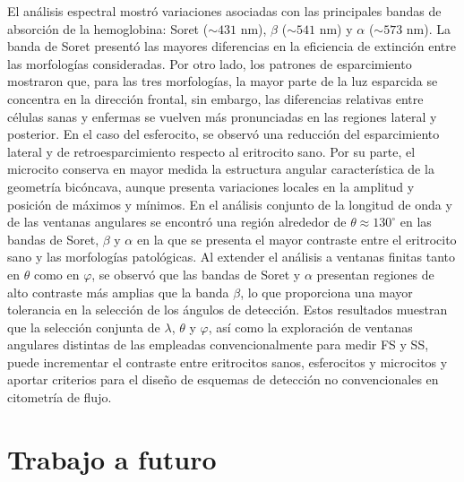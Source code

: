 El análisis espectral mostró variaciones asociadas con las principales bandas de absorción de la hemoglobina: Soret ($\sim 431$ nm), $\beta$ ($\sim 541$ nm) y $\alpha$ ($\sim 573$ nm). La banda de Soret presentó las mayores diferencias en la eficiencia de extinción entre las morfologías consideradas. Por otro lado, los patrones de esparcimiento mostraron que, para las tres morfologías, la mayor parte de la luz esparcida se concentra en la dirección frontal, sin embargo, las diferencias relativas entre células sanas y enfermas se vuelven más pronunciadas en las regiones lateral y posterior. En el caso del esferocito, se observó una reducción del esparcimiento lateral y de retroesparcimiento respecto al eritrocito sano. Por su parte, el microcito conserva en mayor medida la estructura angular característica de la geometría bicóncava, aunque presenta variaciones locales en la amplitud y posición de máximos y mínimos. En el análisis conjunto de la longitud de onda y de las ventanas angulares se encontró una región alrededor de $\theta\approx130^\circ$ en las bandas de Soret, $\beta$ y $\alpha$ en la que se presenta el mayor contraste entre el eritrocito sano y las morfologías patológicas. Al extender el análisis a ventanas finitas tanto en $\theta$ como en $\varphi$, se observó que las bandas de Soret y $\alpha$ presentan regiones de alto contraste más amplias que la banda $\beta$, lo que proporciona una mayor tolerancia en la selección de los ángulos de detección. Estos resultados muestran que la selección conjunta de $\lambda$, $\theta$ y $\varphi$, así como la exploración de ventanas angulares distintas de las empleadas convencionalmente para medir FS y SS, puede incrementar el contraste entre eritrocitos sanos, esferocitos y microcitos y aportar criterios para el diseño de esquemas de detección no convencionales en citometría de flujo.


\section*{Trabajo a futuro}

\label{section:trabajo_futuro}
%

